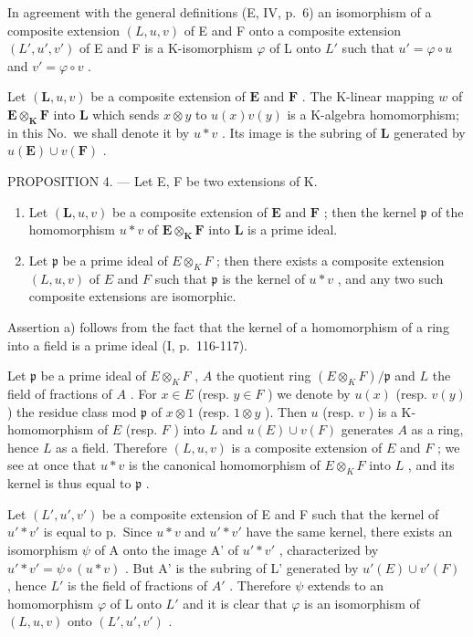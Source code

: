 In agreement with the general definitions (E, IV, p.~6) an isomorphism of a composite extension \((L, u, v)\) of E and F onto a composite extension \((L', u', v')\) of E and F is a K-isomorphism \(\varphi\) of L onto \(L'\) such that \(u' = \varphi \circ u\) and \(v' = \varphi \circ v\) .

Let \((\mathbf{L}, u, v)\) be a composite extension of \(\mathbf{E}\) and \(\mathbf{F}\) . The K-linear mapping \(w\) of \(\mathbf{E} \otimes_{\mathbf{K}} \mathbf{F}\) into \(\mathbf{L}\) which sends \(x \otimes y\) to \(u(x)v(y)\) is a K-algebra homomorphism; in this No.~we shall denote it by \(u * v\) . Its image is the subring of \(\mathbf{L}\) generated by \(u(\mathbf{E}) \cup v(\mathbf{F})\) .

PROPOSITION 4. --- Let E, F be two extensions of K.

\begin{enumerate}
\def\labelenumi{\alph{enumi})}
\item
  Let \((\mathbf{L}, u, v)\) be a composite extension of \(\mathbf{E}\) and \(\mathbf{F}\) ; then the kernel \(\mathfrak{p}\) of the homomorphism \(u * v\) of \(\mathbf{E} \otimes_{\mathbf{K}} \mathbf{F}\) into \(\mathbf{L}\) is a prime ideal.
\item
  Let \(\mathfrak{p}\) be a prime ideal of \(E \otimes_{K} F\) ; then there exists a composite extension \((L, u, v)\) of \(E\) and \(F\) such that \(\mathfrak{p}\) is the kernel of \(u * v\) , and any two such composite extensions are isomorphic.
\end{enumerate}

Assertion a) follows from the fact that the kernel of a homomorphism of a ring into a field is a prime ideal (I, p.~116-117).

Let \(\mathfrak{p}\) be a prime ideal of \(E \otimes_{K} F\) , \(A\) the quotient ring \((E \otimes_{K} F)/\mathfrak{p}\) and \(L\) the field of fractions of \(A\) . For \(x \in E\) (resp. \(y \in F\) ) we denote by \(u(x)\) (resp. \(v(y)\) ) the residue class mod \(\mathfrak{p}\) of \(x \otimes 1\) (resp. \(1 \otimes y\) ). Then \(u\) (resp. \(v\) ) is a K-homomorphism of \(E\) (resp. \(F\) ) into \(L\) and \(u(E) \cup v(F)\) generates \(A\) as a ring, hence \(L\) as a field. Therefore \((L, u, v)\) is a composite extension of \(E\) and \(F\) ; we see at once that \(u * v\) is the canonical homomorphism of \(E \otimes_{K} F\) into \(L\) , and its kernel is thus equal to \(\mathfrak{p}\) .

Let \((L', u', v')\) be a composite extension of E and F such that the kernel of \(u' * v'\) is equal to p.~Since \(u * v\) and \(u' * v'\) have the same kernel, there exists an isomorphism \(\psi\) of A onto the image A' of \(u' * v'\) , characterized by \(u' * v' = \psi \circ (u * v)\) . But A' is the subring of L' generated by \(u'(E) \cup v'(F)\) , hence \(L'\) is the field of fractions of \(A'\) . Therefore \(\psi\) extends to an homomorphism \(\varphi\) of L onto \(L'\) and it is clear that \(\varphi\) is an isomorphism of \((L, u, v)\) onto \((L', u', v')\) .

